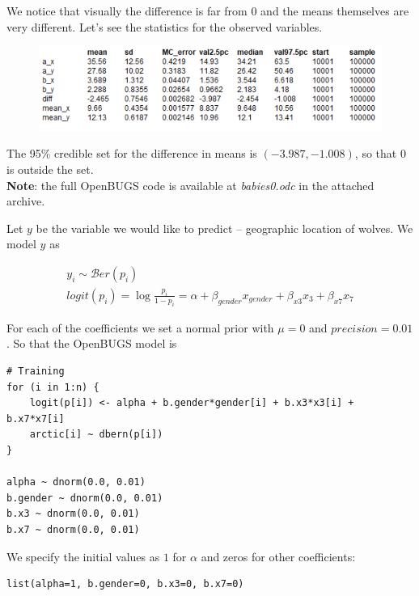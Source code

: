 \documentclass[a4 paper]{article}
\begin{document}
We notice that visually the difference is far 
from $0$ and the means themselves are very 
different. Let's see the statistics for 
the observed variables.

\begin{figure}[H]
	\includegraphics[scale=1.0]{q1_2}
	\centering
	\label{q1_2}
\end{figure}


The 95\% credible set for the difference 
in means is $(-3.987, -1.008)$, so that
 $0$ is outside the set. \\

\textbf{Note}: the full OpenBUGS code is available 
at \textit{babies0.odc} in the attached archive.

 






Let $y$ be the variable we would like to 
predict -- geographic location of wolves.
We model $y$ as

\begin{align*}
	y_{i}	\sim\mathcal{B}er\left(p_{i}\right) \\
	logit\left(p_{i}\right)	=\log\frac{p_{i}}{1-p_{i}}=\alpha+\beta_{gender}x_{gender}+\beta_{x3}x_{3}+\beta_{x7}x_{7}
\end{align*}

For each of the coefficients we set a 
normal prior with $\mu=0$ and $precision=0.01$. 
So that the OpenBUGS model is 

\begin{Verbatim}
# Training
for (i in 1:n) {
	logit(p[i]) <- alpha + b.gender*gender[i] + b.x3*x3[i] + b.x7*x7[i]
	arctic[i] ~ dbern(p[i])
}

alpha ~ dnorm(0.0, 0.01)
b.gender ~ dnorm(0.0, 0.01)
b.x3 ~ dnorm(0.0, 0.01)
b.x7 ~ dnorm(0.0, 0.01)
\end{Verbatim} 

We specify the initial values as $1$ for $\alpha$ 
and zeros for other coefficients:
\begin{Verbatim}
list(alpha=1, b.gender=0, b.x3=0, b.x7=0)  
\end{Verbatim} 
\end{document}
